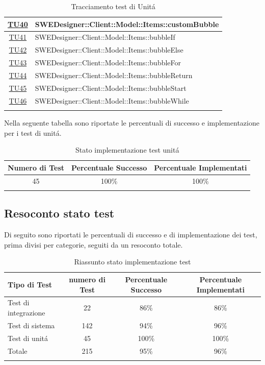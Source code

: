 \documentclass[../PianoDiQualifica.tex]{subfiles}
\begin{document}
\begin{longtable}{|c|l|}
			\hyperlink{TU40}{TU40} & SWEDesigner::Client::Model::Items::customBubble \\
			\hline
			\hyperlink{TU41}{TU41} &SWEDesigner::Client::Model::Items::bubbleIf \\
			\hline
			\hyperlink{TU42}{TU42} &SWEDesigner::Client::Model::Items::bubbleElse \\
			\hline
			\hyperlink{TU43}{TU43} & SWEDesigner::Client::Model::Items::bubbleFor\\
			\hline
			\hyperlink{TU44}{TU44} &SWEDesigner::Client::Model::Items::bubbleReturn \\
			\hline
			\hyperlink{TU45}{TU45} &SWEDesigner::Client::Model::Items::bubbleStart \\
			\hline
			\hyperlink{TU46}{TU46} &SWEDesigner::Client::Model::Items::bubbleWhile \\
			\hline
			\caption[Tracciamento test di Unit\'a]{Tracciamento test di Unit\'a}
			\label{tabella:TracciamentoTestUnit\'a}
		\end{longtable}
		Nella seguente tabella sono riportate le percentuali di successo e implementazione per i test di unit\'a.
			\normalsize
			\begin{longtable}{|c|c|c|}
				\hline
				\textbf{Numero di Test} & \textbf{Percentuale Successo} & \textbf{Percentuale Implementati}\\
				\hline
				\endhead
				45 &100\% &100\%\\
				\hline
				\caption[Stato implementazione test unit\'a]{Stato implementazione test unit\'a}
				\label{tabella:Stato implementazione test unit\'a}
			\end{longtable}
			
		\subsection{Resoconto stato test}
		Di seguito sono riportati le percentuali di successo e di implementazione dei test, prima divisi per categorie, seguiti da un resoconto totale.%
		
		\normalsize
		\begin{longtable}{|l|c|c|c|}
			\hline
			\textbf{Tipo di Test}&\textbf{numero di Test} & \textbf{Percentuale Successo} & \textbf{Percentuale Implementati}\\
			\hline
			\endhead
			Test di integrazione & 22 & 86\% & 86\%\\
			\hline
			Test di sistema & 142&94\% &96\%\\
			\hline
			Test di unit\'a & 45 &100\% &100\%\\
			\hline
			Totale &215 &95\% &96\%\\
			\hline
			\caption[Riassunto stato implementazione test ]{Riassunto stato implementazione test }
			\label{tabella:Riassunto stato implementazione Test }
		\end{longtable}
\end{document}
